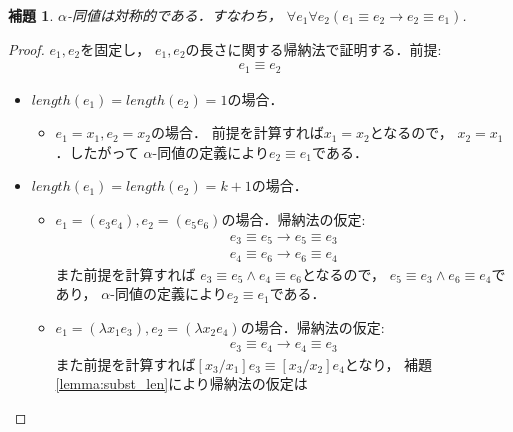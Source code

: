 \documentclass{ltjsbook}%
\newtheorem{lemma}{補題}[section]%
\newcommand\lemmaname{補題}%
\begin{document}
\begin{lemma}%
  $\alpha$-同値は対称的である．すなわち，%
  $\forall\mathit{e}_1\forall\mathit{e}_2%
  (\mathit{e}_1\equiv \mathit{e}_2\rightarrow\mathit{e}_2\equiv \mathit{e}_1)$.%
\end{lemma}%
\begin{proof}%
  $\mathit{e}_1,\mathit{e}_2$を固定し，%
  $\mathit{e}_1,\mathit{e}_2$の長さに関する帰納法で証明する．前提:%
  \begin{align}%
    \mathit{e}_1\equiv \mathit{e}_2%
  \end{align}%
  \begin{itemize}%
  \item $length(\mathit{e}_1)=length(\mathit{e}_2)=1$の場合．%
  \begin{itemize}%
  \item $\mathit{e}_1=\mathit{x}_1,\mathit{e}_2=\mathit{x}_2$の場合．%
    前提を計算すれば$\mathit{x}_1=\mathit{x}_2$となるので，%
    $\mathit{x}_2=\mathit{x}_1$．したがって%
    $\alpha$-同値の定義により$\mathit{e}_2\equiv \mathit{e}_1$である．%
  \end{itemize}%
  \item $length(\mathit{e}_1)=length(\mathit{e}_2)=k+1$の場合．%
  \begin{itemize}%
  \item $\mathit{e}_1=(\mathit{e}_3\mathit{e}_4),%
    \mathit{e}_2=(\mathit{e}_5\mathit{e}_6)$の場合．帰納法の仮定:%
    \begin{align}%
    \mathit{e}_3\equiv\mathit{e}_5\rightarrow%
    \mathit{e}_5\equiv\mathit{e}_3\\%
    \mathit{e}_4\equiv\mathit{e}_6\rightarrow%
    \mathit{e}_6\equiv\mathit{e}_4%
    \end{align}%
    また前提を計算すれば%
    $\mathit{e}_3\equiv\mathit{e}_5\land\mathit{e}_4\equiv\mathit{e}_6$となるので，%
    $\mathit{e}_5\equiv\mathit{e}_3\land\mathit{e}_6\equiv\mathit{e}_4$であり，%
    $\alpha$-同値の定義により$\mathit{e}_2\equiv \mathit{e}_1$である．%
  \item $\mathit{e}_1=(\lambda \mathit{x}_1\mathit{e}_3),%
    \mathit{e}_2=(\lambda \mathit{x}_2\mathit{e}_4)$の場合．帰納法の仮定:%
    \begin{align}%
    \mathit{e}_3\equiv\mathit{e}_4\rightarrow%
    \mathit{e}_4\equiv\mathit{e}_3%
    \end{align}%
    また前提を計算すれば${}[\mathit{x}_3/\mathit{x}_1]\mathit{e}_3%
    \equiv{}[\mathit{x}_3/\mathit{x}_2]\mathit{e}_4$となり，%
    \lemmaname\ref{lemma:subst_len}により帰納法の仮定は%

\end{itemize}
\end{itemize}
\end{proof}
\end{document}

